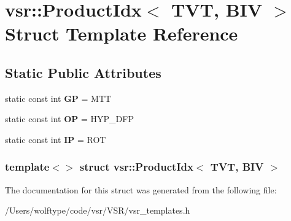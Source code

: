 \hypertarget{structvsr_1_1_product_idx_3_01_t_v_t_00_01_b_i_v_01_4}{\section{vsr\-:\-:Product\-Idx$<$ T\-V\-T, B\-I\-V $>$ Struct Template Reference}
\label{structvsr_1_1_product_idx_3_01_t_v_t_00_01_b_i_v_01_4}
}
\subsection*{Static Public Attributes}
\begin{DoxyCompactItemize}
\item 
\hypertarget{structvsr_1_1_product_idx_3_01_t_v_t_00_01_b_i_v_01_4_aead5cbed6e0e77d76cbd63903b27c25f}{static const int {\bfseries G\-P} = M\-T\-T}\label{structvsr_1_1_product_idx_3_01_t_v_t_00_01_b_i_v_01_4_aead5cbed6e0e77d76cbd63903b27c25f}

\item 
\hypertarget{structvsr_1_1_product_idx_3_01_t_v_t_00_01_b_i_v_01_4_a8c68e1ed95a6154bc72c700e9186c181}{static const int {\bfseries O\-P} = H\-Y\-P\-\_\-\-D\-F\-P}\label{structvsr_1_1_product_idx_3_01_t_v_t_00_01_b_i_v_01_4_a8c68e1ed95a6154bc72c700e9186c181}

\item 
\hypertarget{structvsr_1_1_product_idx_3_01_t_v_t_00_01_b_i_v_01_4_ab9db96cd8e24a4baf0867ed8b8134ff1}{static const int {\bfseries I\-P} = R\-O\-T}\label{structvsr_1_1_product_idx_3_01_t_v_t_00_01_b_i_v_01_4_ab9db96cd8e24a4baf0867ed8b8134ff1}

\end{DoxyCompactItemize}
\subsubsection*{template$<$$>$ struct vsr\-::\-Product\-Idx$<$ T\-V\-T, B\-I\-V $>$}



The documentation for this struct was generated from the following file\-:\begin{DoxyCompactItemize}
\item 
/\-Users/wolftype/code/vsr/\-V\-S\-R/vsr\-\_\-templates.\-h\end{DoxyCompactItemize}
